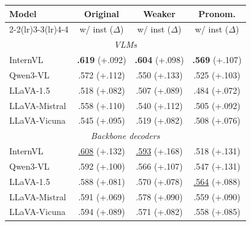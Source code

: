 \begin{table}[h]
\centering\small
\setlength{\tabcolsep}{4pt}
\begin{tabular}{lccc}
\toprule
Model & \multicolumn{1}{c}{\textbf{Original}} & \multicolumn{1}{c}{\textbf{Weaker}} & \multicolumn{1}{c}{\textbf{Pronom.}} \\
\cmidrule(lr){2-2}\cmidrule(lr){3-3}\cmidrule(lr){4-4}
& \small w/ inst ($\Delta$) & \small w/ inst ($\Delta$) & \small w/ inst ($\Delta$) \\
\midrule
\multicolumn{4}{c}{\textit{VLMs}} \\
\midrule
InternVL & \textbf{.619} {(\textcolor[HTML]{0072B2}{+.092})} & \textbf{.604} {(\textcolor[HTML]{0072B2}{+.098})} & \textbf{.569} {(\textcolor[HTML]{0072B2}{+.107})} \\
Qwen3-VL & .572 {(\textcolor[HTML]{0072B2}{+.112})} & .550 {(\textcolor[HTML]{0072B2}{+.133})} & .525 {(\textcolor[HTML]{0072B2}{+.103})} \\
LLaVA-1.5 & .518 {(\textcolor[HTML]{0072B2}{+.082})} & .507 {(\textcolor[HTML]{0072B2}{+.089})} & .484 {(\textcolor[HTML]{0072B2}{+.072})} \\
LLaVA-Mistral & .558 {(\textcolor[HTML]{0072B2}{+.110})} & .540 {(\textcolor[HTML]{0072B2}{+.112})} & .505 {(\textcolor[HTML]{0072B2}{+.092})} \\
LLaVA-Vicuna & .545 {(\textcolor[HTML]{0072B2}{+.095})} & .519 {(\textcolor[HTML]{0072B2}{+.082})} & .508 {(\textcolor[HTML]{0072B2}{+.076})} \\
\midrule
\multicolumn{4}{c}{\textit{Backbone decoders}} \\
\midrule
InternVL & \underline{.608} {(\textcolor[HTML]{0072B2}{+.132})} & \underline{.593} {(\textcolor[HTML]{0072B2}{+.168})} & .518 {(\textcolor[HTML]{0072B2}{+.131})} \\
Qwen3-VL & .592 {(\textcolor[HTML]{0072B2}{+.100})} & .566 {(\textcolor[HTML]{0072B2}{+.107})} & .547 {(\textcolor[HTML]{0072B2}{+.131})} \\
LLaVA-1.5 & .588 {(\textcolor[HTML]{0072B2}{+.081})} & .570 {(\textcolor[HTML]{0072B2}{+.078})} & \underline{.564} {(\textcolor[HTML]{0072B2}{+.088})} \\
LLaVA-Mistral & .591 {(\textcolor[HTML]{0072B2}{+.069})} & .578 {(\textcolor[HTML]{0072B2}{+.090})} & .559 {(\textcolor[HTML]{0072B2}{+.090})} \\
LLaVA-Vicuna & .594 {(\textcolor[HTML]{0072B2}{+.089})} & .571 {(\textcolor[HTML]{0072B2}{+.082})} & .558 {(\textcolor[HTML]{0072B2}{+.085})} \\

\end{tabular}
\end{table}
